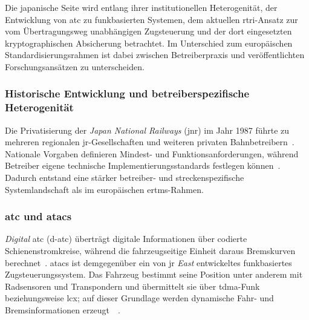\documentclass[runningheads]{res/llncs}
\begin{document}
Die japanische Seite wird entlang ihrer institutionellen Heterogenität, der Entwicklung von \gls{atc} zu funkbasierten Systemen, dem aktuellen \gls{rtri}-Ansatz zur vom Übertragungsweg unabhängigen Zugsteuerung und der dort eingesetzten kryptographischen Absicherung betrachtet. Im Unterschied zum europäischen Standardisierungsrahmen ist dabei zwischen Betreiberpraxis und veröffentlichten Forschungsansätzen zu unterscheiden.

\subsubsection{Historische Entwicklung und betreiberspezifische Heterogenität}
\label{sec:Historische_Entwicklung_und_betreiberspezifische_Heterogenität}
Die Privatisierung der \textit{Japan National Railways} (\gls{jnr}) im Jahr 1987 führte zu mehreren regionalen \gls{jr}-Gesellschaften und weiteren privaten Bahnbetreibern~\parencite[S. 47]{yanaseJapanese2011}. Nationale Vorgaben definieren Mindest- und Funktionsanforderungen, während Betreiber eigene technische Implementierungsstandards festlegen können~\parencite[S. 48--49, 51]{yanaseJapanese2011}. Dadurch entstand eine stärker betreiber- und streckenspezifische Systemlandschaft als im europäischen \gls{ertms}-Rahmen.

\subsubsection{\texorpdfstring{\gls{atc} und \gls{atacs}}{ATC und ATACS}}
\label{sec:ATC_und_ATACS}
\textit{Digital} \gls{atc} (\gls{d-atc}) überträgt digitale Informationen über codierte Schienenstromkreise, während die fahrzeugseitige Einheit daraus Bremskurven berechnet~\parencite[S. 44--45]{h.tsukisawaStandardization2024}. \gls{atacs} ist demgegenüber ein von \gls{jr} \textit{East} entwickeltes funkbasiertes Zugsteuerungssystem. Das Fahrzeug bestimmt seine Position unter anderem mit Radsensoren und Transpondern und übermittelt sie über \gls{tdma}-Funk beziehungsweise \gls{lcx}; auf dieser Grundlage werden dynamische Fahr- und Bremsinformationen erzeugt~\parencite[S. 13--14]{xiangliuCyber2020}~\parencite[S. 6, 8]{iwamotoTrain2024}.
\end{document}
